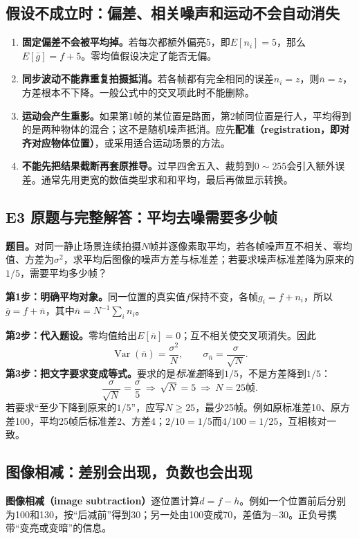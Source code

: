 \subsection{假设不成立时：偏差、相关噪声和运动不会自动消失}
\begin{enumerate}[label=\arabic*.]
  \item \textbf{固定偏差不会被平均掉。}若每次都额外偏亮5，即$E[n_i]=5$，那么$E[\bar g]=f+5$。零均值假设决定了能否无偏。
  \item \textbf{同步波动不能靠重复拍摄抵消。}若各帧都有完全相同的误差$n_i=z$，则$\bar n=z$，方差根本不下降。一般公式中的交叉项此时不能删除。
  \item \textbf{运动会产生重影。}如果第1帧的某位置是路面，第2帧同位置是行人，平均得到的是两种物体的混合；这不是随机噪声抵消。应先\textbf{配准（registration，即对齐对应物体位置）}，或采用适合运动场景的方法。
  \item \textbf{不能先把结果截断再套原推导。}过早四舍五入、裁剪到$0\sim255$会引入额外误差。通常先用更宽的数值类型求和和平均，最后再做显示转换。
\end{enumerate}

\subsection{E3 原题与完整解答：平均去噪需要多少帧}
\label{original:E3}
\textbf{题目。}对同一静止场景连续拍摄$N$帧并逐像素取平均，若各帧噪声互不相关、零均值、方差为$\sigma^2$，求平均后图像的噪声方差与标准差；若要求噪声标准差降为原来的$1/5$，需要平均多少帧？

\textbf{第1步：明确平均对象。}同一位置的真实值$f$保持不变，各帧$g_i=f+n_i$，所以$\bar g=f+\bar n$，其中$\bar n=N^{-1}\sum_i n_i$。

\textbf{第2步：代入题设。}零均值给出$E[\bar n]=0$；互不相关使交叉项消失。因此
\[
  \boxed{\operatorname{Var}(\bar n)=\frac{\sigma^2}{N}},
  \qquad \boxed{\sigma_{\bar n}=\frac{\sigma}{\sqrt N}}.
\]
\textbf{第3步：把文字要求变成等式。}要求的是\emph{标准差}降到$1/5$，不是方差降到$1/5$：
\[
 \frac{\sigma}{\sqrt N}=\frac{\sigma}{5}
 \ \Longrightarrow\ \sqrt N=5
 \ \Longrightarrow\ \boxed{N=25\text{帧}}.
\]
若要求“至少下降到原来的$1/5$”，应写$N\ge25$，最少25帧。例如原标准差10、原方差100，平均25帧后标准差2、方差4；$2/10=1/5$而$4/100=1/25$，互相核对一致。

\subsection{图像相减：差别会出现，负数也会出现}
\textbf{图像相减（image subtraction）}逐位置计算$d=f-h$。例如一个位置前后分别为100和130，按“后减前”得到30；另一处由100变成70，差值为$-30$。正负号携带“变亮或变暗”的信息。

